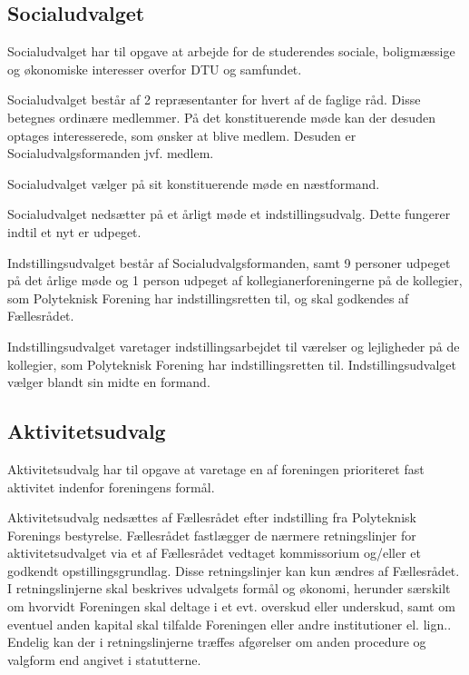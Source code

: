 \begin{list}

\subsection{Socialudvalget}
\label{L:kap:socialudvalg}
\item Socialudvalget har til opgave at arbejde for de studerendes sociale, boligmæssige og økonomiske interesser overfor DTU og samfundet.\\

\item Socialudvalget består af 2 repræsentanter for hvert af de faglige råd. Disse betegnes ordinære medlemmer. På det konstituerende møde kan der desuden optages interesserede, som ønsker at blive medlem. Desuden er Socialudvalgsformanden jvf.  medlem.

\item Socialudvalget vælger på sit konstituerende møde en næstformand.

\item Socialudvalget nedsætter på et årligt møde et indstillingsudvalg. Dette fungerer indtil et nyt er udpeget.

 Indstillingsudvalget består af Socialudvalgsformanden, samt 9 personer udpeget på det årlige møde og 1 person udpeget af kollegianerforeningerne på de kollegier, som Polyteknisk Forening har indstillingsretten til, og skal godkendes af Fællesrådet.

 Indstillingsudvalget varetager indstillingsarbejdet til værelser og lejligheder på de kollegier, som Polyteknisk Forening har indstillingsretten til. Indstillingsudvalget vælger blandt sin midte en formand.



\subsection{Aktivitetsudvalg}
\label{L:kap:aktivitetsudvalg}
\item Aktivitetsudvalg har til opgave at varetage en af foreningen prioriteret fast aktivitet indenfor foreningens formål.

\item \label{L:Aktivitet:nedsaettelse} Aktivitetsudvalg nedsættes af Fællesrådet efter indstilling fra Polyteknisk Forenings bestyrelse. Fællesrådet fastlægger de nærmere retningslinjer for aktivitetsudvalget via et af Fællesrådet vedtaget kommissorium og/eller et godkendt opstillingsgrundlag. Disse retningslinjer kan kun ændres af Fællesrådet. I retningslinjerne skal beskrives udvalgets formål og økonomi, herunder særskilt om hvorvidt Foreningen skal deltage i et evt. overskud eller underskud, samt om eventuel anden kapital skal tilfalde Foreningen eller andre institutioner el. lign.. Endelig kan der i retningslinjerne træffes afgørelser om anden procedure og valgform end angivet i statutterne.


\end{list}
